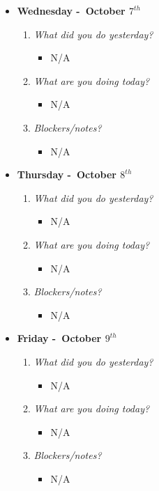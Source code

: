 \begin{itemize}
  \item[] \textbf{\large Wednesday -\ October \(7^{th}\)}
  \begin{enumerate}
    \item \textsl{What did you do yesterday?}
    \begin{itemize}
      \item N/A
    \end{itemize}
    \item \textsl{What are you doing today?}
    \begin{itemize}
      \item N/A
    \end{itemize}
    \item \textsl{Blockers/notes?}
    \begin{itemize}
      \item N/A
    \end{itemize}
  \end{enumerate}
\end{itemize}
\textbf{}
\begin{itemize}
  \item[] \textbf{\large Thursday -\ October \(8^{th}\)}
  \begin{enumerate}
    \item \textsl{What did you do yesterday?}
    \begin{itemize}
      \item N/A
    \end{itemize}
    \item \textsl{What are you doing today?}
    \begin{itemize}
      \item N/A
    \end{itemize}
    \item \textsl{Blockers/notes?}
    \begin{itemize}
      \item N/A
    \end{itemize}
  \end{enumerate}
\end{itemize}
\textbf{}
\begin{itemize}
  \item[] \textbf{\large Friday -\ October \(9^{th}\)}
  \begin{enumerate}
    \item \textsl{What did you do yesterday?}
    \begin{itemize}
      \item N/A
    \end{itemize}
    \item \textsl{What are you doing today?}
    \begin{itemize}
      \item N/A
    \end{itemize}
    \item \textsl{Blockers/notes?}
    \begin{itemize}
      \item N/A
    \end{itemize}
  \end{enumerate}
\end{itemize}